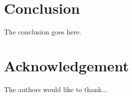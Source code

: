 \documentclass[conference]{IEEEtran}
\begin{document}
%





\section{Conclusion}
The conclusion goes here.






\section*{Acknowledgement}


The authors would like to thank...





\end{document}
